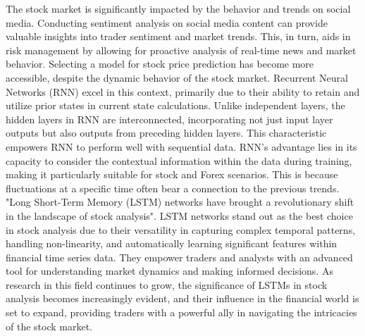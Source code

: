 \documentclass[./main.tex]{subfiles}
\begin{document}
\noindent
The stock market is significantly impacted by the behavior and trends on social media. 
Conducting sentiment analysis on social media content can provide valuable insights into trader sentiment and market trends. This, in turn, aids in risk management by allowing for proactive analysis of real-time news and market behavior. \cite{bollen2011twitter} 
\medskip
\newline
\noindent 
Selecting a model for stock price prediction has become more accessible, despite the dynamic behavior of the stock market. Recurrent Neural Networks (RNN) excel in this context, primarily due to their ability to retain and utilize prior states in current state calculations. Unlike independent layers, the hidden layers in RNN are interconnected, incorporating not just input layer outputs but also outputs from preceding hidden layers. This characteristic empowers RNN to perform well with sequential data. RNN's advantage lies in its capacity to consider the contextual information within the data during training, making it particularly suitable for stock and Forex scenarios. This is because fluctuations at a specific time often bear a connection to the previous trends. \cite{asi4010009}
\medskip
\newline
\noindent
"Long Short-Term Memory (LSTM) networks have brought a revolutionary shift in the landscape of stock analysis". \cite{ZHANG2021872} 
\noindent
 LSTM networks stand out as the best choice in stock analysis due to their versatility in capturing complex temporal patterns, handling non-linearity, and automatically learning significant features within financial time series data. They empower traders and analysts with an advanced tool for understanding market dynamics and making informed decisions. As research in this field continues to grow, the significance of LSTMs in stock analysis becomes increasingly evident, and their influence in the financial world is set to expand, providing traders with a powerful ally in navigating the intricacies of the stock market. \cite{zhang2018stock}
\noindent
\end{document}
